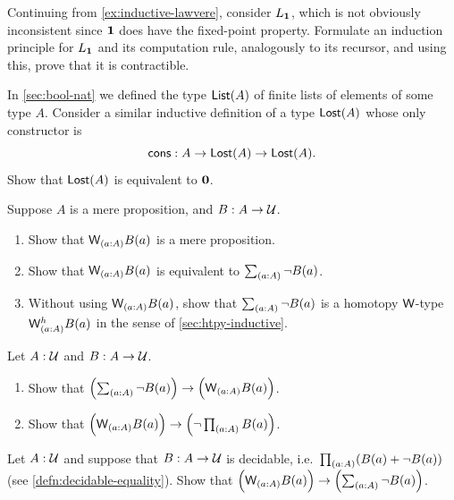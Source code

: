 \begin{ex}\label{ex:ilunit}
  Continuing from \cref{ex:inductive-lawvere}, consider $L_\mathbf{1}$, which is not obviously inconsistent since $\mathbf{1}$ does have the fixed-point property.
  Formulate an induction principle for $L_\mathbf{1}$ and its computation rule, analogously to its recursor, and using this, prove that it is contractible.
\end{ex}

\begin{ex}\label{ex:empty-inductive-type}
In \cref{sec:bool-nat} we defined the type $\mathsf{List}(A)$ of finite lists of elements of some type $A$.
Consider a similar inductive definition of a type $\mathsf{Lost}(A)$ whose only constructor is
\[ \mathsf{cons}: A \to \mathsf{Lost}(A) \to \mathsf{Lost}(A). \]
Show that $\mathsf{Lost}(A)$ is equivalent to $\mathbf{0}$.
\end{ex}

\begin{ex}\label{ex:Wprop}
  Suppose $A$ is a mere proposition, and $B:A\to \mathcal{U}$.
  \begin{enumerate}
  \item Show that $\wtype{a:A} B(a)$ is a mere proposition.
  \item Show that $\wtype{a:A} B(a)$ is equivalent to $\sm{a:A} \neg B(a)$.
  \item Without using $\wtype{a:A} B(a)$, show that $\sm{a:A} \neg B(a)$ is a homotopy $\mathsf{W}$-type $\wtypeh{a:A} B(a)$ in the sense of \cref{sec:htpy-inductive}.
  \end{enumerate}
\end{ex}

\begin{ex}\label{ex:Wbounds}
  Let $A:\mathcal{U}$ and $B:A\to \mathcal{U}$.
  \begin{enumerate}
  \item Show that $\Parens{\sm{a:A} \neg B(a)} \to \Parens{\wtype{a:A} B(a)}$.
  \item Show that $\Parens{\wtype{a:A} B(a)} \to \Parens{\neg \prd{a:A} B(a)}$.
  \end{enumerate}
\end{ex}

\begin{ex}\label{ex:Wdec}
  Let $A:\mathcal{U}$ and suppose that $B:A\to \mathcal{U}$ is decidable, i.e.\ $\prd{a:A} (B(a)+\neg B(a))$ (see \cref{defn:decidable-equality}).
  Show that $\Parens{\wtype{a:A} B(a)} \to \Parens{\sm{a:A} \neg B(a)}$.
\end{ex}

